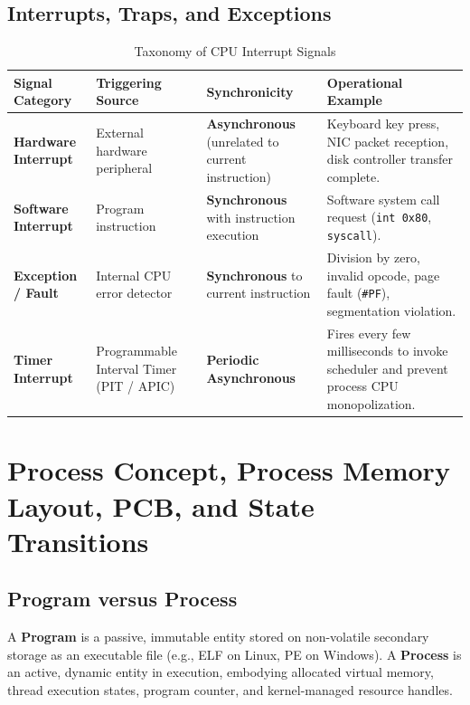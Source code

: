 \subsection{Interrupts, Traps, and Exceptions}
\begin{table}[htbp]
\centering
\small
\caption{Taxonomy of CPU Interrupt Signals}
\label{tab:interrupt_taxonomy}
\begin{tabularx}{\textwidth}{l p{3.2cm} p{3.8cm} X}
\toprule
\textbf{Signal Category} & \textbf{Triggering Source} & \textbf{Synchronicity} & \textbf{Operational Example} \\
\midrule
\textbf{Hardware Interrupt} & External hardware peripheral & \textbf{Asynchronous} (unrelated to current instruction) & Keyboard key press, NIC packet reception, disk controller transfer complete. \\
\textbf{Software Interrupt} & Program instruction & \textbf{Synchronous} with instruction execution & Software system call request (\texttt{int 0x80}, \texttt{syscall}). \\
\textbf{Exception / Fault} & Internal CPU error detector & \textbf{Synchronous} to current instruction & Division by zero, invalid opcode, page fault (\texttt{\#PF}), segmentation violation. \\
\textbf{Timer Interrupt} & Programmable Interval Timer (PIT / APIC) & \textbf{Periodic Asynchronous} & Fires every few milliseconds to invoke scheduler and prevent process CPU monopolization. \\
\bottomrule
\end{tabularx}
\end{table}

\section{Process Concept, Process Memory Layout, PCB, and State Transitions}
\label{sec:os_processes}

\subsection{Program versus Process}
A \textbf{Program} is a passive, immutable entity stored on non-volatile secondary storage as an executable file (e.g., ELF on Linux, PE on Windows). A \textbf{Process} is an active, dynamic entity in execution, embodying allocated virtual memory, thread execution states, program counter, and kernel-managed resource handles.


